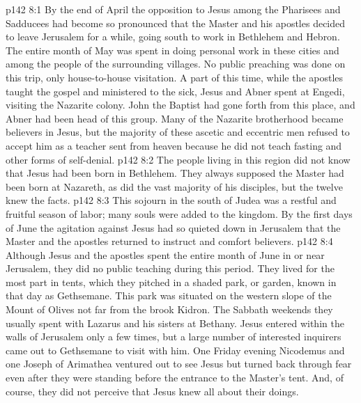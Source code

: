 \vs p142 8:1 By the end of April the opposition to Jesus among the Pharisees and Sadducees had become so pronounced that the Master and his apostles decided to leave Jerusalem for a while, going south to work in Bethlehem and Hebron. The entire month of May was spent in doing personal work in these cities and among the people of the surrounding villages. No public preaching was done on this trip, only house\hyp{}to\hyp{}house visitation. A part of this time, while the apostles taught the gospel and ministered to the sick, Jesus and Abner spent at Engedi, visiting the Nazarite colony. John the Baptist had gone forth from this place, and Abner had been head of this group. Many of the Nazarite brotherhood became believers in Jesus, but the majority of these ascetic and eccentric men refused to accept him as a teacher sent from heaven because he did not teach fasting and other forms of self\hyp{}denial.
\vs p142 8:2 The people living in this region did not know that Jesus had been born in Bethlehem. They always supposed the Master had been born at Nazareth, as did the vast majority of his disciples, but the twelve knew the facts.
\vs p142 8:3 This sojourn in the south of Judea was a restful and fruitful season of labor; many souls were added to the kingdom. By the first days of June the agitation against Jesus had so quieted down in Jerusalem that the Master and the apostles returned to instruct and comfort believers.
\vs p142 8:4 Although Jesus and the apostles spent the entire month of June in or near Jerusalem, they did no public teaching during this period. They lived for the most part in tents, which they pitched in a shaded park, or garden, known in that day as Gethsemane. This park was situated on the western slope of the Mount of Olives not far from the brook Kidron. The Sabbath weekends they usually spent with Lazarus and his sisters at Bethany. Jesus entered within the walls of Jerusalem only a few times, but a large number of interested inquirers came out to Gethsemane to visit with him. One Friday evening Nicodemus and one Joseph of Arimathea ventured out to see Jesus but turned back through fear even after they were standing before the entrance to the Master’s tent. And, of course, they did not perceive that Jesus knew all about their doings.
